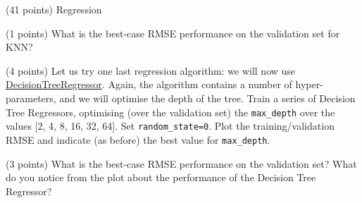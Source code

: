 \documentclass[12pt]{article}
\begin{document}
\begin{question}{\label{Q_LR_BA}(41 points) Regression}
\begin{subquestion}{(1 points) What is the best-case RMSE performance on the validation set for KNN?}



\end{subquestion}

\begin{subquestion}{(4 points) Let us try one last regression algorithm: we will now use \href{https://scikit-learn.org/stable/modules/generated/sklearn.tree.DecisionTreeRegressor.html}{DecisionTreeRegressor}. Again, the algorithm contains a number of hyper-parameters, and we will optimise the depth of the tree. Train a series of Decision Tree Regressors, optimising (over the validation set) the \texttt{max\_depth} over the values [2, 4, 8, 16, 32, 64]. Set \texttt{random\_state=0}. Plot the training/validation RMSE and indicate (as before) the best value for \texttt{max\_depth}.}






\end{subquestion}

\begin{subquestion}{(3 points) What is the best-case RMSE performance on the validation set? What do you notice from the plot about the performance of the Decision Tree Regressor?}







\end{subquestion}
\end{question}
\end{document}
